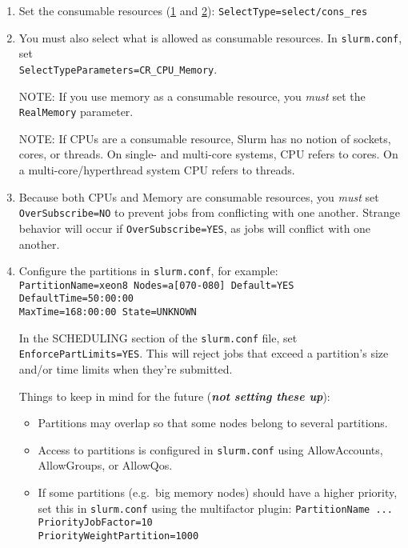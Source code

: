 \begin{enumerate}
\begin{enumerate}
\begin{enumerate}
		\item Set the consumable resources (\href{https://slurm.schedmd.com/cons_res.html}{1} and \href{https://slurm.schedmd.com/cons_res_share.html}{2}):
		\texttt{SelectType=select/cons\_res}
	
		\item You must also select what is allowed as consumable resources. In \texttt{slurm.conf}, set \\
		\texttt{SelectTypeParameters=CR\_CPU\_Memory}. 
	
		NOTE: If you use memory as a consumable resource, you \emph{must} set the \texttt{RealMemory} parameter.
	
		NOTE: If CPUs are a consumable resource, Slurm has no notion of sockets, cores, or threads. On single- and multi-core systems, CPU refers to cores. On a multi-core/hyperthread system CPU refers to threads.
	
		\item Because both CPUs and Memory are consumable resources, you \emph{must} set \texttt{OverSubscribe=NO} to prevent jobs from conflicting with one another. Strange behavior will occur if \texttt{OverSubscribe=YES}, as jobs will conflict with one another. %

		\item Configure the partitions in \texttt{slurm.conf}, for example: \\
		\texttt{PartitionName=xeon8 Nodes=a[070-080] Default=YES DefaultTime=50:00:00 \\ MaxTime=168:00:00 State=UNKNOWN}

		In the SCHEDULING section of the \texttt{slurm.conf} file, set \texttt{EnforcePartLimits=YES}. This will reject jobs that exceed a partition's size and/or time limits when they're submitted.

		Things to keep in mind for the future (\emph{\textbf{not setting these up}}):
			\begin{itemize}
			\item Partitions may overlap so that some nodes belong to several partitions. 
	
			\item Access to partitions is configured in \texttt{slurm.conf} using AllowAccounts, AllowGroups, or AllowQos.
	
			\item If some partitions (e.g.\ big memory nodes) should have a higher priority, set this in \texttt{slurm.conf} using the multifactor plugin:
			\texttt{PartitionName ... PriorityJobFactor=10} \\
			\texttt{PriorityWeightPartition=1000}
			\end{itemize}


\end{enumerate}
\end{enumerate}
\end{enumerate}
